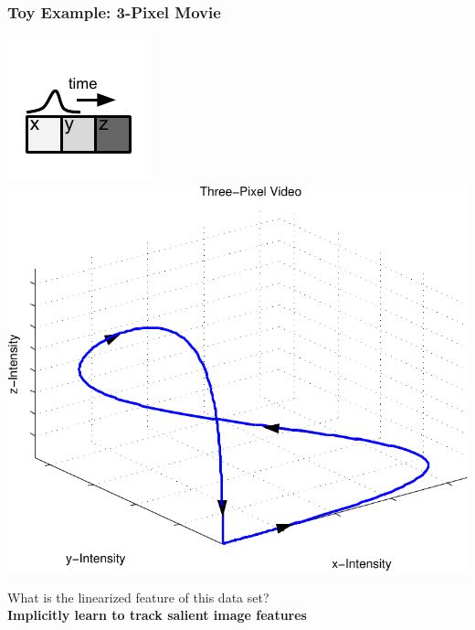 \documentclass{beamer}
\begin{document}
\begin{frame} 
\frametitle{Toy Example: 3-Pixel Movie}
\includegraphics[scale=1]{./Figures/Project2/fig1.pdf} 
\includegraphics[scale=0.5]{./Figures/Project2/fig2.pdf} \\
\begin{center} 
What is the linearized feature of this data set? \\
\textbf{Implicitly learn to track salient image features}
\end{center} 
\end{frame} 
\end{document}
